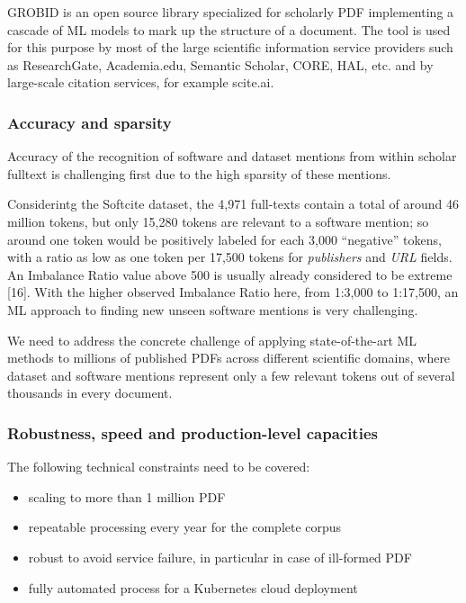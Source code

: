 \documentclass[
]{article}
\providecommand{\tightlist}{%
  \setlength{\itemsep}{0pt}\setlength{\parskip}{0pt}}
\begin{document}
GROBID is an open source library specialized for scholarly PDF
implementing a cascade of ML models to mark up the structure of a
document. The tool is used for this purpose by most of the large
scientific information service providers such as ResearchGate,
Academia.edu, Semantic Scholar, CORE, HAL, etc. and by large-scale
citation services, for example scite.ai.

\hypertarget{accuracy-and-sparsity}{%
\subsubsection{Accuracy and sparsity}\label{accuracy-and-sparsity}}

Accuracy of the recognition of software and dataset mentions from within
scholar fulltext is challenging first due to the high sparsity of these
mentions.

Considerintg the Softcite dataset, the 4,971 full-texts contain a total
of around 46 million tokens, but only 15,280 tokens are relevant to a
software mention; so around one token would be positively labeled for
each 3,000 ``negative'' tokens, with a ratio as low as one token per
17,500 tokens for \emph{publishers} and \emph{URL} fields. An Imbalance
Ratio value above 500 is usually already considered to be extreme
{[}16{]}. With the higher observed Imbalance Ratio here, from 1:3,000 to
1:17,500, an ML approach to finding new unseen software mentions is very
challenging.

We need to address the concrete challenge of applying state-of-the-art
ML methods to millions of published PDFs across different scientific
domains, where dataset and software mentions represent only a few
relevant tokens out of several thousands in every document.

\hypertarget{robustness-speed-and-production-level-capacities}{%
\subsubsection{Robustness, speed and production-level
capacities}\label{robustness-speed-and-production-level-capacities}}

The following technical constraints need to be covered:

\begin{itemize}
\tightlist
\item
  scaling to more than 1 million PDF
\item
  repeatable processing every year for the complete corpus
\item
  robust to avoid service failure, in particular in case of ill-formed
  PDF
\item
  fully automated process for a Kubernetes cloud deployment
\end{itemize}
\end{document}
